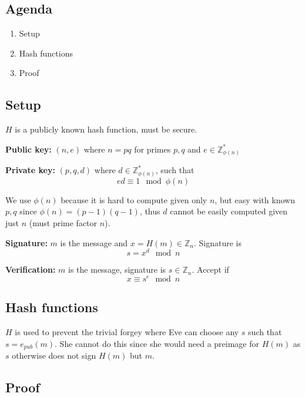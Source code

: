 

\subsection*{Agenda}
\begin{enumerate}
\item Setup
\item Hash functions
\item Proof
\end{enumerate}

\subsection{Setup}
$H$ is a publicly known hash function, must be secure.

\textbf{Public key:} $(n, e)$ where $n = pq$ for primes $p, q$ and $e \in \mathbb{Z}_{\phi(n)}^*$

\textbf{Private key:} $(p, q, d)$ where $d \in \mathbb{Z}_{\phi(n)}^*$, such that
\[ ed \equiv 1 \mod \phi(n) \]

We use $\phi(n)$ because it is hard to compute given only $n$, but
easy with known $p, q$ since $\phi(n) = (p-1)(q-1)$, thus $d$ cannot
be easily computed given just $n$ (must prime factor $n$).

\textbf{Signature:} $m$ is the message and $x = H(m) \in \mathbb{Z}_n$. Signature is
\[ s = x^d \mod n \]

\textbf{Verification:} $m$ is the message, signature is $s \in \mathbb{Z}_n$. Accept if
\[ x \equiv s^e \mod n \]

\subsection{Hash functions}
$H$ is used to prevent the trivial forgey where Eve can choose any $s$
such that $s = e_{pub}(m)$. She cannot do this since she would need a
preimage for $H(m)$ as $s$ otherwise does not sign $H(m)$ but $m$.

\subsection{Proof}
